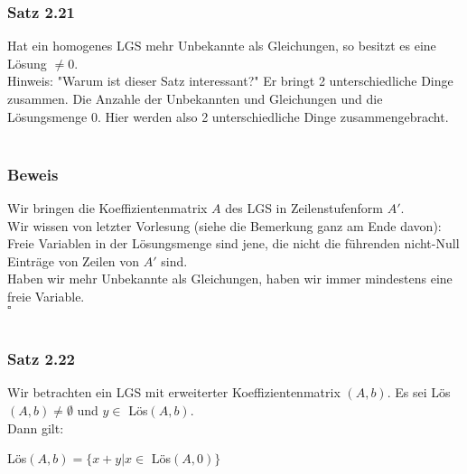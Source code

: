 \documentclass{article}
\begin{document}
\subsubsection*{Satz 2.21}
Hat ein homogenes LGS mehr Unbekannte als Gleichungen, so besitzt es eine Lösung $\neq 0$. \\
Hinweis: "Warum ist dieser Satz interessant?" Er bringt 2 unterschiedliche Dinge zusammen. Die Anzahle der Unbekannten und Gleichungen und die Lösungsmenge 0. Hier werden also 2 unterschiedliche Dinge zusammengebracht. \\
\\
\subsubsection*{Beweis}
Wir bringen die Koeffizientenmatrix $A$ des LGS in Zeilenstufenform $A'$. \\
Wir wissen von letzter Vorlesung (siehe die Bemerkung ganz am Ende davon): Freie Variablen in der Lösungsmenge sind jene, die nicht die führenden nicht-Null Einträge von Zeilen von $A'$ sind. \\
Haben wir mehr Unbekannte als Gleichungen, haben wir immer mindestens eine freie Variable. \\
$\square$ \\
\\
\subsubsection*{Satz 2.22}
Wir betrachten ein LGS mit erweiterter Koeffizientenmatrix $(A,b)$. Es sei Lös$(A,b) \neq \emptyset$ und $y \in $ Lös$(A,b)$. \\
Dann gilt: \\
\begin{center}
    Lös$(A,b) = \{x+y | x \in$ Lös$(A,0)\}$
\end{center}
\end{document}

